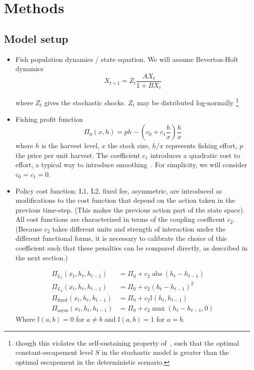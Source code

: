\documentclass[review, 12pt]{elsarticle}
\begin{document}
\section{Methods}

\subsection{Model setup}

\begin{itemize}
  \item   Fish population dynamics / state equation.  We will assume Beverton-Holt dynamics
    \begin{equation} 
      X_{t+1} = Z_t \frac{A X_t}{1 + B X_t} 
    \end{equation}
    
    where $Z_t$ gives the stochastic shocks.  $Z_t$ may be distributed log-normally \footnote{though this violates the self-sustaining property of~\citet{Reed1979}, such that the optimal constant-escapement level $S$ in the stochastic model is greater than the optimal escapement in the deterministic scenario.}

\item   Fishing profit function 
  \begin{equation} 
    \Pi_0(x,h) = p h - \left( c_0  + c_1 \frac{h}{x} \right) \frac{h}{x} \label{profit}
  \end{equation}
  where $h$ is the harvest level, $x$ the stock size, $h/x$ represents fishing effort, $p$ the price per unit harvest.  The coefficient $c_1$ introduces a quadratic cost to effort, a typical way to introduce smoothing~\citep{something}.  For simplicity, we will consider $c_0 = c_1 = 0$.  

\item   Policy cost function: L1, L2, fixed fee, asymmetric, are introduced as modifications to the cost function that depend on the action taken in the previous time-step.  (This makes the previous action part of the state space).   All cost functions are characterized in terms of the coupling coefficent $c_2$.  (Because $c_2$ takes different units and strength of interaction under the different functional forms, it is necessary to calibrate the choice of this coefficient such that these penalties can be compared directly, as described in the next section.)

  \begin{align} 
    \Pi_{L_1}(x_t,h_t, h_{t-1}) &= \Pi_0 + c_2 \operatorname{abs}\left( h_t - h_{t-1} \right) \label{L1} \\
    \Pi_{L_2}(x_t,h_t, h_{t-1}) &= \Pi_0 + c_2 \left( h_t - h_{t-1} \right)^2 \label{L2} \\
    \Pi_{\textrm{fixed}}(x_t,h_t, h_{t-1}) &= \Pi_0 + c_2 \mathbb{I}(h_t, h_{t-1})  \label{fixed_fee} \\
    \Pi_{\textrm{asym}}(x_t,h_t, h_{t-1}) &= \Pi_0 + c_2 \operatorname{max}\left( h_t - h_{t-1}, 0 \right) \label{asym}
  \end{align}
  Where $\mathbb{I}(a,b) = 0$ for $a \neq b$ and  $\mathbb{I}(a,b) = 1$ for $a = b$.  


\end{itemize}
\end{document}
